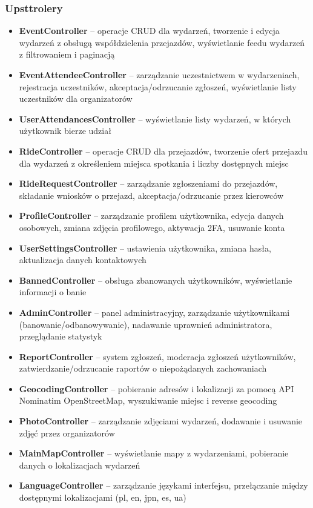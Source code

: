 \documentclass[12pt,a4paper]{article}
\begin{document}
\subsubsection{Upsttrolery}
\begin{itemize}
    \item \textbf{EventController} -- operacje CRUD dla wydarzeń, tworzenie i edycja wydarzeń z obsługą współdzielenia przejazdów, wyświetlanie feedu wydarzeń z filtrowaniem i paginacją
    \item \textbf{EventAttendeeController} -- zarządzanie uczestnictwem w wydarzeniach, rejestracja uczestników, akceptacja/odrzucanie zgłoszeń, wyświetlanie listy uczestników dla organizatorów
    \item \textbf{UserAttendancesController} -- wyświetlanie listy wydarzeń, w których użytkownik bierze udział
    \item \textbf{RideController} -- operacje CRUD dla przejazdów, tworzenie ofert przejazdu dla wydarzeń z określeniem miejsca spotkania i liczby dostępnych miejsc
    \item \textbf{RideRequestController} -- zarządzanie zgłoszeniami do przejazdów, składanie wniosków o przejazd, akceptacja/odrzucanie przez kierowców
    \item \textbf{ProfileController} -- zarządzanie profilem użytkownika, edycja danych osobowych, zmiana zdjęcia profilowego, aktywacja 2FA, usuwanie konta
    \item \textbf{UserSettingsController} -- ustawienia użytkownika, zmiana hasła, aktualizacja danych kontaktowych
    \item \textbf{BannedController} -- obsługa zbanowanych użytkowników, wyświetlanie informacji o banie
    \item \textbf{AdminController} -- panel administracyjny, zarządzanie użytkownikami (banowanie/odbanowywanie), nadawanie uprawnień administratora, przeglądanie statystyk
    \item \textbf{ReportController} -- system zgłoszeń, moderacja zgłoszeń użytkowników, zatwierdzanie/odrzucanie raportów o niepożądanych zachowaniach
    \item \textbf{GeocodingController} -- pobieranie adresów i lokalizacji za pomocą API Nominatim OpenStreetMap, wyszukiwanie miejsc i reverse geocoding
    \item \textbf{PhotoController} -- zarządzanie zdjęciami wydarzeń, dodawanie i usuwanie zdjęć przez organizatorów
    \item \textbf{MainMapController} -- wyświetlanie mapy z wydarzeniami, pobieranie danych o lokalizacjach wydarzeń
    \item \textbf{LanguageController} -- zarządzanie językami interfejsu, przełączanie między dostępnymi lokalizacjami (pl, en, jpn, es, ua)
\end{itemize}
\end{document}
